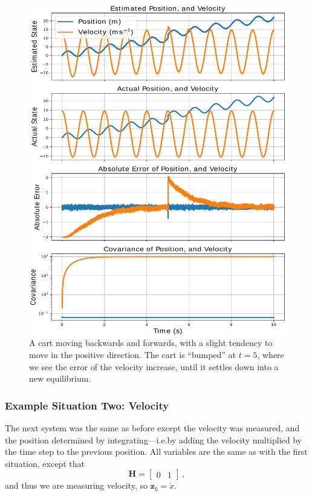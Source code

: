 \documentclass[12pt]{article}
\begin{document}
\begin{figure}[thp]
	\centering
	
	\includegraphics[width=\textwidth]{1d-position.pdf}
	
	\caption{A cart moving backwards and forwards, with a slight tendency to move in the positive direction. The cart is ``bumped'' at $t=5$, where we see the error of the velocity increase, until it settles down into a new equilibrium.}
	\label{1d_position_fig}
\end{figure}

\subsubsection{Example Situation Two: Velocity}

The next system was the same as before except the velocity was measured, and the position determined by integrating---i.e.\@ by adding the velocity multiplied by the time step to the previous position. All variables are the same as with the first situation, except that
$$\mathbf{H} = \begin{bmatrix} 0 & 1 \end{bmatrix} \,,$$
and thus we are measuring velocity, so $\mathbf{z}_k=\dot{x}$.
\end{document}
